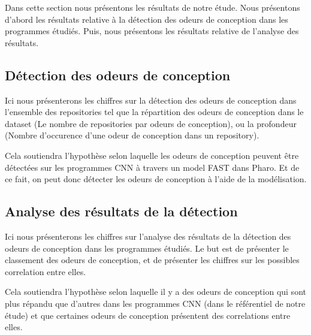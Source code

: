\label{sec:results}
Dans cette section nous présentons les résultats de notre étude. Nous présentons
d'abord les résultats relative à la détection des odeurs de conception dans les
programmes étudiés. Puis, nous présentons les résultats relative de l'analyse des
résultats.

\subsection{Détection des odeurs de conception}
\label{sec:results1}
Ici nous présenterons les chiffres sur la détection des odeurs de conception
dans l'ensemble des repositories tel que la répartition des odeurs de
conception dans le dataset (Le nombre de repositories par odeurs de conception),
ou la profondeur (Nombre d'occurence d'une odeur de conception dans un
repository).


Cela soutiendra l'hypothèse selon laquelle les odeurs de conception peuvent être
détectées sur les programmes CNN à travers un model FAST dans Pharo. Et de ce
fait, on peut donc détecter les odeurs de conception à l'aide de la modélisation.




\subsection{Analyse des résultats de la détection}
\label{sec:results2}
Ici nous présenterons les chiffres sur l'analyse des résultats de la détection
des odeurs de conception dans les programmes étudiés. Le but est de présenter le
classement des odeurs de conception, et de présenter les chiffres sur les
possibles correlation entre elles.

Cela soutiendra l'hypothèse selon laquelle il y a des odeurs de conception qui sont plus répandu que d'autres dans
les programmes CNN (dans le référentiel de notre étude) et que certaines odeurs
de conception présentent des correlations entre elles.

